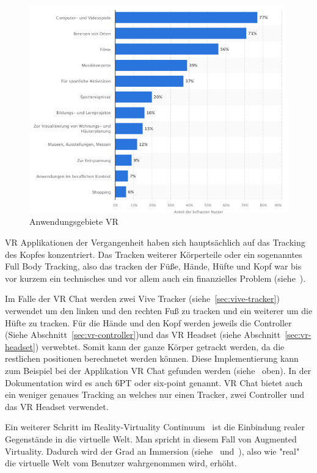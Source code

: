 \begin{figure}
    \begin{center}
        \includegraphics[scale=0.4]{pics/statistic_usage_vr}
    \end{center}
    \caption{Anwendungsgebiete VR~\cite{BITKOM_2021}}
    \label{fig:statistic_usage_vr}
\end{figure}

VR Applikationen der Vergangenheit haben sich hauptsächlich auf das Tracking des Kopfes konzentriert.
Das Tracken weiterer Körperteile oder ein sogenanntes Full Body Tracking, also das tracken der Füße, Hände, Hüfte und Kopf war bis vor kurzem ein technisches und vor allem auch ein finanzielles Problem (siehe~\cite{PAVEL_NUZHDIN_2020}).

Im Falle der VR Chat werden zwei Vive Tracker (siehe~\ref{sec:vive-tracker}) verwendet um den linken und den rechten Fuß zu tracken und ein weiterer um die Hüfte zu tracken.
Für die Hände und den Kopf werden jeweils die Controller (Siehe Abschnitt~\ref{sec:vr-controller})und das VR Headset (siehe Abschnitt~\ref{sec:vr-headset}) verwebtet.
Somit kann der ganze Körper getrackt werden, da die restlichen positionen berechnetet werden können.
Diese Implementierung kann zum Beispiel bei der Applikation VR Chat gefunden werden (siehe~\cite{VRCHAT_DOCS_2021} oben).
In der Dokumentation wird es auch 6PT oder six-point genannt.
VR Chat bietet auch ein weniger genaues Tracking an welches nur einen Tracker, zwei Controller und das VR Headset verwendet.

Ein weiterer Schritt im Reality-Virtuality Continuum~\cite{MILGRAM_1994} ist die Einbindung realer Gegenstände in die virtuelle Welt.
Man spricht in diesem Fall von Augmented Virtuality.
Dadurch wird der Grad an Immersion (siehe~\cite{EMEST_ADAMS_2004} und~\cite{BJOERK_2003}), also wie "real" die virtuelle Welt vom Benutzer wahrgenommen wird, erhöht.

